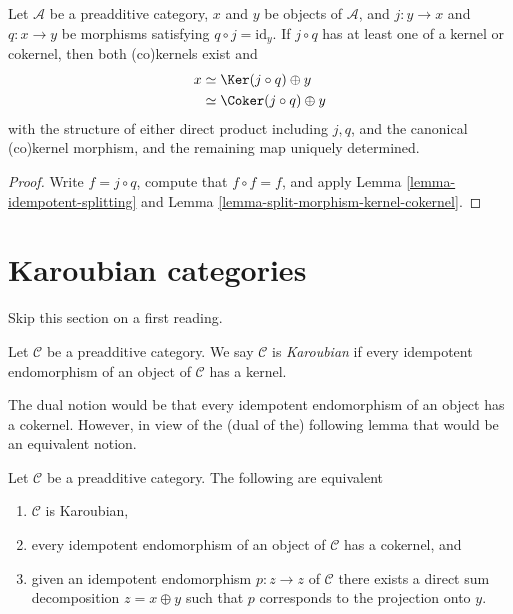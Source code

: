 \begin{lemma}
\label{lemma-split-morphism-splitting}
Let $\mathcal{A}$ be a preadditive category,
$x$ and $y$ be objects of $\mathcal{A}$,
and $j : y \to x$ and $q : x \to y$ be morphisms
satisfying $q \circ j = \text{id} _ y$.
If $j \circ q$ has at least one of a kernel or cokernel,
then both (co)kernels exist and
\begin{align*}
x
& \simeq \Ker (j \circ q) \oplus y \\
& \simeq \Coker (j \circ q) \oplus y
\end{align*}
with the structure of either direct product including $j , q$,
and the canonical (co)kernel morphism,
and the remaining map uniquely determined.
\end{lemma}

\begin{proof}
Write $f = j \circ q$,
compute that $f \circ f = f$,
and apply Lemma \ref{lemma-idempotent-splitting}
and Lemma \ref{lemma-split-morphism-kernel-cokernel}.
\end{proof}




\section{Karoubian categories}
\label{section-karoubian}

\noindent
Skip this section on a first reading.

\begin{definition}
\label{definition-karoubian}
Let $\mathcal{C}$ be a preadditive category. We say $\mathcal{C}$
is {\it Karoubian} if every idempotent endomorphism of an object
of $\mathcal{C}$ has a kernel.
\end{definition}

\noindent
The dual notion would be that every idempotent endomorphism of an
object has a cokernel. However, in view of the (dual of the)
following lemma that would be an equivalent notion.

\begin{lemma}
\label{lemma-karoubian}
Let $\mathcal{C}$ be a preadditive category. The following
are equivalent
\begin{enumerate}
\item $\mathcal{C}$ is Karoubian,
\item every idempotent endomorphism of an object of $\mathcal{C}$ has a
cokernel, and
\item given an idempotent endomorphism $p : z \to z$ of $\mathcal{C}$
there exists a direct sum decomposition $z = x \oplus y$ such
that $p$ corresponds to the projection onto $y$.
\end{enumerate}
\end{lemma}


